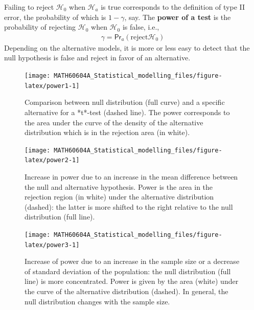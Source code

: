 \documentclass[
  11pt,
  letterpaper,
]{book}
\theoremstyle{definition}
\theoremstyle{definition}
\theoremstyle{definition}
\theoremstyle{remark}
\begin{document}
Failing to reject \(\mathscr{H}_0\) when \(\mathscr{H}_a\) is true corresponds to the definition of type II error, the probability of which is \(1-\gamma\), say. The \textbf{power of a test} is the probability of rejecting \(\mathscr{H}_0\) when \(\mathscr{H}_0\) is false, i.e.,
\begin{align*}
\gamma = \mathsf{Pr}_a(\text{reject} \mathscr{H}_0)
\end{align*}
Depending on the alternative models, it is more or less easy to detect that the null hypothesis is false and reject in favor of an alternative.

\begin{figure}

{\centering \texttt{[image: MATH60604A\_Statistical\_modelling\_files/figure-latex/power1-1]} 

}

\caption{Comparison between null distribution (full curve) and a specific alternative for a *t*-test (dashed line). The power corresponds to the area under the curve of the density of the alternative distribution which is in the rejection area (in white).}\label{fig:power1}
\end{figure}

\begin{figure}

{\centering \texttt{[image: MATH60604A\_Statistical\_modelling\_files/figure-latex/power2-1]} 

}

\caption{Increase in power due to an increase in the mean difference between the null and alternative hypothesis. Power is the area in the rejection region (in white) under the alternative distribution (dashed): the latter is more shifted to the right relative to the null distribution (full line).}\label{fig:power2}
\end{figure}

\begin{figure}

{\centering \texttt{[image: MATH60604A\_Statistical\_modelling\_files/figure-latex/power3-1]} 

}

\caption{Increase of power due to an increase in the sample size or a decrease of standard deviation of the population: the null distribution (full line) is more concentrated. Power is given by the area (white) under the curve of the alternative distribution (dashed). In general, the null distribution changes with the sample size.}\label{fig:power3}
\end{figure}
\end{document}
